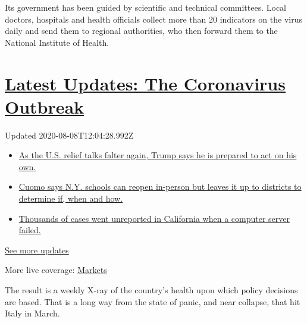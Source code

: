 Its government has been guided by scientific and technical committees.
Local doctors, hospitals and health officials collect more than 20
indicators on the virus daily and send them to regional authorities, who
then forward them to the National Institute of Health.

\hypertarget{latest-updates-the-coronavirus-outbreak}{%
\section{\texorpdfstring{\href{https://www.nytimes.com/2020/08/07/world/covid-19-news.html?action=click\&pgtype=Article\&state=default\&region=MAIN_CONTENT_1\&context=storylines_live_updates}{Latest
Updates: The Coronavirus
Outbreak}}{Latest Updates: The Coronavirus Outbreak}}\label{latest-updates-the-coronavirus-outbreak}}

Updated 2020-08-08T12:04:28.992Z

\begin{itemize}
\tightlist
\item
  \href{https://www.nytimes.com/2020/08/07/world/covid-19-news.html?action=click\&pgtype=Article\&state=default\&region=MAIN_CONTENT_1\&context=storylines_live_updates\#link-1f86d03a}{As
  the U.S. relief talks falter again, Trump says he is prepared to act
  on his own.}
\item
  \href{https://www.nytimes.com/2020/08/07/world/covid-19-news.html?action=click\&pgtype=Article\&state=default\&region=MAIN_CONTENT_1\&context=storylines_live_updates\#link-3f64a70a}{Cuomo
  says N.Y. schools can reopen in-person but leaves it up to districts
  to determine if, when and how.}
\item
  \href{https://www.nytimes.com/2020/08/07/world/covid-19-news.html?action=click\&pgtype=Article\&state=default\&region=MAIN_CONTENT_1\&context=storylines_live_updates\#link-14e70066}{Thousands
  of cases went unreported in California when a computer server failed.}
\end{itemize}

\href{https://www.nytimes.com/2020/08/07/world/covid-19-news.html?action=click\&pgtype=Article\&state=default\&region=MAIN_CONTENT_1\&context=storylines_live_updates}{See
more updates}

More live coverage:
\href{https://www.nytimes.com/live/2020/08/07/business/stock-market-today-coronavirus?action=click\&pgtype=Article\&state=default\&region=MAIN_CONTENT_1\&context=storylines_live_updates}{Markets}

The result is a weekly X-ray of the country's health upon which policy
decisions are based. That is a long way from the state of panic, and
near collapse, that hit Italy in March.

